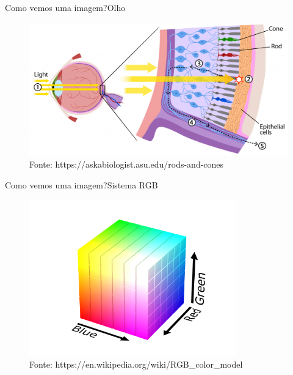 \documentclass{beamer}
\begin{document}
\begin{frame}{Como vemos uma imagem?}{Olho}
    \begin{figure}
        \centering
        \includegraphics[width=\textwidth]{figs/rods-cones.png}
        \caption{Fonte: https://askabiologist.asu.edu/rods-and-cones}
    \end{figure}
\end{frame}

\begin{frame}{Como vemos uma imagem?}{Sistema {\color{red}R}{\color{green}G}{\color{blue}B}}
    \begin{figure}
        \centering
        \includegraphics[width=0.8\textwidth]{figs/rgb-cube.png}
        \caption{Fonte: https://en.wikipedia.org/wiki/RGB\_color\_model}
    \end{figure}
\end{frame}
\end{document}
